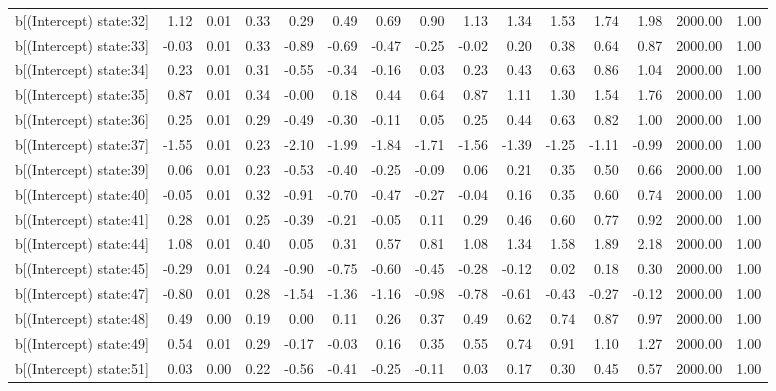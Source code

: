 \begin{table}[ht]
\begin{tabular}{rrrrrrrrrrrrrrr}
  b[(Intercept) state:32] & 1.12 & 0.01 & 0.33 & 0.29 & 0.49 & 0.69 & 0.90 & 1.13 & 1.34 & 1.53 & 1.74 & 1.98 & 2000.00 & 1.00 \\ 
  b[(Intercept) state:33] & -0.03 & 0.01 & 0.33 & -0.89 & -0.69 & -0.47 & -0.25 & -0.02 & 0.20 & 0.38 & 0.64 & 0.87 & 2000.00 & 1.00 \\ 
  b[(Intercept) state:34] & 0.23 & 0.01 & 0.31 & -0.55 & -0.34 & -0.16 & 0.03 & 0.23 & 0.43 & 0.63 & 0.86 & 1.04 & 2000.00 & 1.00 \\ 
  b[(Intercept) state:35] & 0.87 & 0.01 & 0.34 & -0.00 & 0.18 & 0.44 & 0.64 & 0.87 & 1.11 & 1.30 & 1.54 & 1.76 & 2000.00 & 1.00 \\ 
  b[(Intercept) state:36] & 0.25 & 0.01 & 0.29 & -0.49 & -0.30 & -0.11 & 0.05 & 0.25 & 0.44 & 0.63 & 0.82 & 1.00 & 2000.00 & 1.00 \\ 
  b[(Intercept) state:37] & -1.55 & 0.01 & 0.23 & -2.10 & -1.99 & -1.84 & -1.71 & -1.56 & -1.39 & -1.25 & -1.11 & -0.99 & 2000.00 & 1.00 \\ 
  b[(Intercept) state:39] & 0.06 & 0.01 & 0.23 & -0.53 & -0.40 & -0.25 & -0.09 & 0.06 & 0.21 & 0.35 & 0.50 & 0.66 & 2000.00 & 1.00 \\ 
  b[(Intercept) state:40] & -0.05 & 0.01 & 0.32 & -0.91 & -0.70 & -0.47 & -0.27 & -0.04 & 0.16 & 0.35 & 0.60 & 0.74 & 2000.00 & 1.00 \\ 
  b[(Intercept) state:41] & 0.28 & 0.01 & 0.25 & -0.39 & -0.21 & -0.05 & 0.11 & 0.29 & 0.46 & 0.60 & 0.77 & 0.92 & 2000.00 & 1.00 \\ 
  b[(Intercept) state:44] & 1.08 & 0.01 & 0.40 & 0.05 & 0.31 & 0.57 & 0.81 & 1.08 & 1.34 & 1.58 & 1.89 & 2.18 & 2000.00 & 1.00 \\ 
  b[(Intercept) state:45] & -0.29 & 0.01 & 0.24 & -0.90 & -0.75 & -0.60 & -0.45 & -0.28 & -0.12 & 0.02 & 0.18 & 0.30 & 2000.00 & 1.00 \\ 
  b[(Intercept) state:47] & -0.80 & 0.01 & 0.28 & -1.54 & -1.36 & -1.16 & -0.98 & -0.78 & -0.61 & -0.43 & -0.27 & -0.12 & 2000.00 & 1.00 \\ 
  b[(Intercept) state:48] & 0.49 & 0.00 & 0.19 & 0.00 & 0.11 & 0.26 & 0.37 & 0.49 & 0.62 & 0.74 & 0.87 & 0.97 & 2000.00 & 1.00 \\ 
  b[(Intercept) state:49] & 0.54 & 0.01 & 0.29 & -0.17 & -0.03 & 0.16 & 0.35 & 0.55 & 0.74 & 0.91 & 1.10 & 1.27 & 2000.00 & 1.00 \\ 
  b[(Intercept) state:51] & 0.03 & 0.00 & 0.22 & -0.56 & -0.41 & -0.25 & -0.11 & 0.03 & 0.17 & 0.30 & 0.45 & 0.57 & 2000.00 & 1.00 \\ 

\end{tabular}
\end{table}
